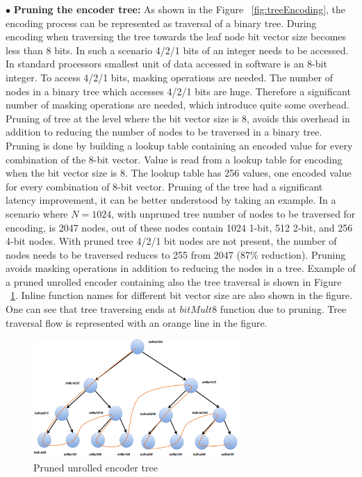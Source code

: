 $\bullet$ \textbf{Pruning the encoder tree:} As shown in the Figure ~\ref{fig:treeEncoding}, the encoding process can be represented as traversal of a binary tree. During encoding when traversing the tree towards the leaf node bit vector size becomes less than 8 bits. In such a scenario 4/2/1 bits of an integer needs to be accessed. In standard processors smallest unit of data accessed in software is an 8-bit integer. To access 4/2/1 bits, masking operations are needed. The number of nodes in a binary tree which accesses 4/2/1 bits are huge. Therefore a significant number of masking operations are needed, which introduce quite some overhead. Pruning of tree at the level where the bit vector size is 8, avoids this overhead in addition to reducing the number of nodes to be traversed in a binary tree. Pruning is done by building a lookup table containing an encoded value for every combination of the 8-bit vector. Value is read from a lookup table for encoding when the bit vector size is 8. The lookup table has 256 values, one encoded value for every combination of 8-bit vector.\newline
\newline
Pruning of the tree had a significant latency improvement, it can be better understood by taking an example. In a scenario where $N = 1024$, with unpruned tree number of nodes to be traversed for encoding, is 2047 nodes, out of these nodes contain 1024 1-bit, 512 2-bit, and 256 4-bit nodes. With pruned tree 4/2/1 bit nodes are not present, the number of nodes needs to be traversed reduces to 255 from 2047 (87\% reduction). Pruning avoids masking operations in addition to reducing the nodes in a tree. \newline
\newline
Example of a pruned unrolled encoder containing also the tree traversal is shown in Figure ~\ref{fig:unrolledEncoder}. Inline function names for different bit vector size are also shown in the figure. One can see that tree traversing ends at $bitMult8$ function due to pruning. Tree traversal flow is represented with an orange line in the figure.

\begin{figure}[!h]
	\centering
	\includegraphics[width=0.7\textwidth]{./figures/unrolledEncoder.pdf}
	\caption{Pruned unrolled encoder tree}
	\label{fig:unrolledEncoder}
\end{figure}

